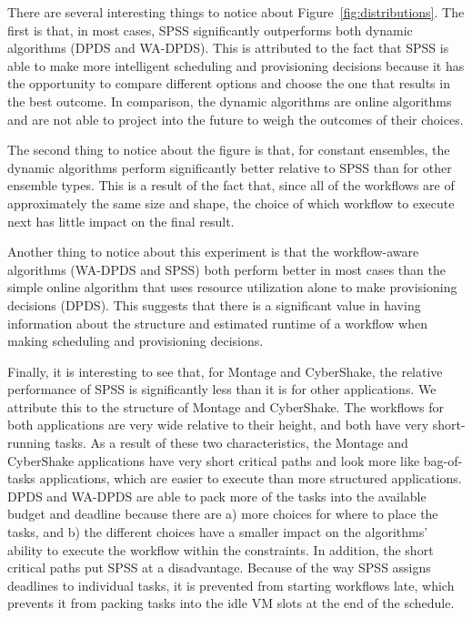\documentclass[conference]{IEEEtran}
\begin{document}
There are several interesting things to notice about
Figure~\ref{fig:distributions}. The first is that, in most cases, SPSS
significantly outperforms both dynamic algorithms (DPDS and WA-DPDS). This is
attributed to the fact that SPSS is able to make more intelligent scheduling
and provisioning decisions because it has the opportunity to compare different
options and choose the one that results in the best outcome. In comparison,
the dynamic algorithms are online algorithms and are not able to project into
the future to weigh the outcomes of their choices.

The second thing to notice about the figure is that, for constant ensembles,
the dynamic algorithms perform significantly better relative to SPSS than for
other ensemble types. This is a result of the fact that, since all of the
workflows are of approximately the same size and shape, the choice of which
workflow to execute next has little impact on the final result.

Another thing to notice about this experiment is that the workflow-aware
algorithms (WA-DPDS and SPSS) both perform better in most cases than the
simple online algorithm that uses resource utilization alone to make
provisioning decisions (DPDS). This suggests that there is a significant value
in having information about the structure and estimated runtime of a workflow
when making scheduling and provisioning decisions.

Finally, it is interesting to see that, for Montage and CyberShake, the
relative performance of SPSS is significantly less than it is for other
applications. We attribute this to the structure of Montage and CyberShake.
The workflows for both applications are very wide relative to their height,
and both have very short-running tasks. As a result of these two
characteristics, the Montage and CyberShake applications have very short
critical paths and look more like bag-of-tasks applications, which are easier
to execute than more structured applications. DPDS and WA-DPDS are able to
pack more of the tasks into the available budget and deadline because there
are a) more choices for where to place the tasks, and b) the different choices
have a smaller impact on the algorithms' ability to execute the workflow
within the constraints. In addition, the short critical paths put SPSS at a
disadvantage. Because of the way SPSS assigns deadlines to individual tasks,
it is prevented from starting workflows late, which prevents it from packing
tasks into the idle VM slots at the end of the schedule.
\end{document}
